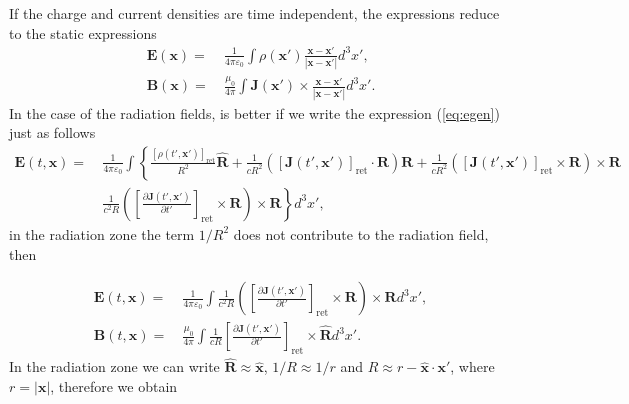 If the charge and current densities are time independent, the expressions
reduce to the static expressions
\begin{align*}
\boldsymbol{E}(\boldsymbol{x})= & \ \frac{1}{4\pi\varepsilon_{0}}\int\rho\left(\boldsymbol{x}'\right)\frac{\boldsymbol{x}-\boldsymbol{x}'}{\left|\boldsymbol{x}-\boldsymbol{x}'\right|}d^{3}x',\\
\boldsymbol{B}(\boldsymbol{x})= & \ \frac{\mu_{0}}{4\pi}\int\boldsymbol{J}\left(\boldsymbol{x}'\right)\times\frac{\boldsymbol{x}-\boldsymbol{x}'}{\left|\boldsymbol{x}-\boldsymbol{x}'\right|}d^{3}x'.
\end{align*}
In the case of the radiation fields, is better if we write the expression
(\ref{eq:egen}) just as follows
\begin{align*}
\boldsymbol{E}\left(t,\boldsymbol{x}\right)= & \ \frac{1}{4\pi\varepsilon_{0}}\int\left\{ \frac{\left[\rho\left(t',\boldsymbol{x}'\right)\right]_{\text{ret}}}{R^{2}}\hat{\boldsymbol{R}}+\frac{1}{cR^{2}}\left(\left[\boldsymbol{J}\left(t',\boldsymbol{x}'\right)\right]_{\text{ret}}\cdot\boldsymbol{R}\right)\boldsymbol{R}+\frac{1}{cR^{2}}\left(\left[\boldsymbol{J}\left(t',\boldsymbol{x}'\right)\right]_{\text{ret}}\times\boldsymbol{R}\right)\times\boldsymbol{R}\right.\\
\  & \ \left.\frac{1}{c^{2}R}\left(\left[\frac{\partial\boldsymbol{J}\left(t',\boldsymbol{x}'\right)}{\partial t'}\right]_{\text{ret}}\times\boldsymbol{R}\right)\times\boldsymbol{R}\right\} d^{3}x',
\end{align*}
in the radiation zone the term $1/R^{2}$ does not contribute to the
radiation field, then

\begin{align*}
\boldsymbol{E}(t,\boldsymbol{x})= & \ \frac{1}{4\pi\varepsilon_{0}}\int\frac{1}{c^{2}R}\left(\left[\frac{\partial\boldsymbol{J}\left(t',\boldsymbol{x}'\right)}{\partial t'}\right]_{\text{ret}}\times\boldsymbol{R}\right)\times\boldsymbol{R}d^{3}x',\\
\boldsymbol{B}(t,\boldsymbol{x})= & \ \frac{\mu_{0}}{4\pi}\int\frac{1}{cR}\left[\frac{\partial\boldsymbol{J}\left(t',\boldsymbol{x}'\right)}{\partial t'}\right]_{\text{ret}}\times\hat{\boldsymbol{R}}d^{3}x'.
\end{align*}
In the radiation zone we can write $\hat{\boldsymbol{R}}\approx\hat{\boldsymbol{x}}$,
$1/R\approx1/r$ and $R\approx r-\hat{\boldsymbol{x}}\cdot\boldsymbol{x}'$,
where $r=\left|\boldsymbol{x}\right|$, therefore we obtain

